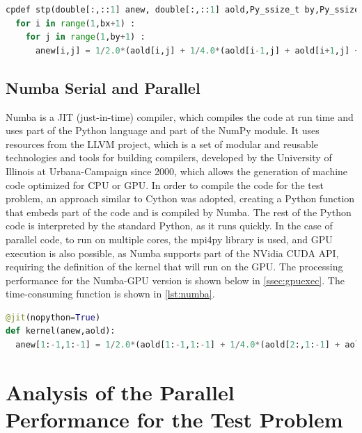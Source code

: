 \documentclass[12pt]{article}
\begin{document}
\begin{lstlisting}[language=Python, label=lst:cython, caption={Time-consuming part of the Cython code of the test problem}]
cpdef stp(double[:,::1] anew, double[:,::1] aold,Py_ssize_t by,Py_ssize_t bx) :
  for i in range(1,bx+1) :
    for j in range(1,by+1) :
      anew[i,j] = 1/2.0*(aold[i,j] + 1/4.0*(aold[i-1,j] + aold[i+1,j] + aold[i,j-1] + aold[i,j+1]))
\end{lstlisting}




\subsection{Numba Serial and Parallel}

Numba is a JIT (just-in-time) compiler, which compiles the code at run time and uses part of the Python language and part of the NumPy module. It uses resources from the LLVM project, which is a set of modular and reusable technologies and tools for building compilers, developed by the University of Illinois at Urbana-Campaign since 2000, which allows the generation of machine code optimized for CPU or GPU. In order to compile the code for the test problem, an approach similar to Cython was adopted, creating a Python function that embeds part of the code and is compiled by Numba. The rest of the Python code is interpreted by the standard Python, as it runs quickly. In the case of parallel code, to run on multiple cores, the mpi4py library is used, and GPU execution is also possible, as Numba supports part of the NVidia CUDA API, requiring the definition of the kernel that will run on the GPU. The processing performance for the Numba-GPU version is shown below in \autoref{ssec:gpuexec}. The time-consuming function is shown in \autoref{lst:numba}.

\begin{lstlisting}[language=Python, label=lst:numba, caption={Time-consuming part of the Numba code of the test problem}, basicstyle=\fontfamily{qhv}\fontseries{c}\selectfont\footnotesize]
@jit(nopython=True)
def kernel(anew,aold):
  anew[1:-1,1:-1] = 1/2.0*(aold[1:-1,1:-1] + 1/4.0*(aold[2:,1:-1] + aold[:-2,1:-1] + aold[1:-1,2:] + aold[1:-1,:-2]))
\end{lstlisting}








\section{Analysis of the Parallel Performance for the Test Problem}
\label{sec:analise}
\end{document}
